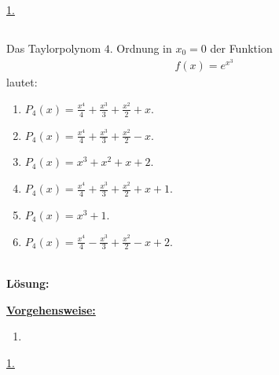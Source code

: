 \underline{1. }\\

\newpage
\subsection*{}
Das Taylorpolynom $ 4 $. Ordnung in $ x_0 = 0 $ der Funktion
\begin{align*}
	f(x) = e^{x^3}
\end{align*}
lautet:
\renewcommand{\labelenumi}{(\alph{enumi})}
\begin{enumerate}
	\item 
	$ P_4(x) = \frac{x^4}{4} + \frac{x^3}{3} + \frac{x^2}{2} + x $. 
	\item
	$ P_4(x) = \frac{x^4}{4} + \frac{x^3}{3} + \frac{x^2}{2} - x $. 
	\item
	$ P_4(x) = x^3 + x^2 + x + 2$. 
	\item
	$ P_4(x) = \frac{x^4}{4} + \frac{x^3}{3} + \frac{x^2}{2} + x +1 $. 
	\item
	$ P_4(x) = x^3 + 1$. 
	\item
	$ P_4(x) = \frac{x^4}{4} - \frac{x^3}{3} + \frac{x^2}{2} - x + 2 $. 
\end{enumerate}
\ \\
\textbf{Lösung:}
\begin{mdframed}
	\underline{\textbf{Vorgehensweise:}}
	\renewcommand{\labelenumi}{\theenumi.}
	\begin{enumerate}
		\item 
	\end{enumerate}
\end{mdframed}

\underline{1. }\\

\newpage


